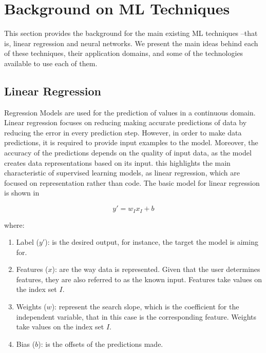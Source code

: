 

\section{Background on \acl{ML} Techniques}
\label{sec:related}

This section provides the background for the main existing \ac{ML} techniques --that is, linear 
regression and neural networks. We present the main ideas behind each of these techniques, their 
application domains, and some of the technologies available to use each of them. 

\subsection{Linear Regression}
\label{sec:linear-regression}

Regression Models are used for the prediction of values in a continuous domain. Linear regression 
focuses on reducing making accurate predictions of data by reducing the error in every prediction 
step. However, in order to make data predictions, it is required to provide input examples to the 
model. Moreover, the accuracy of the predictions depends on the quality of input data, as the model 
creates data representations based on its input. this highlights the main characteristic of supervised 
learning models, as linear regression, which are focused on representation rather than code. The 
basic model for linear regression is shown in 

\begin{equation} \label{eq:linearReg}
y'=w_I x_I+b
\end{equation}

where:
\begin{enumerate}
 \item Label ($y'$): is the desired output, for instance, the target the model is aiming for.
 \item Features ($x$):  are the way data is represented. Given that the user determines features, they are also referred to as the known input. Features take values on the index set $I$. 
 \item Weights ($w$): represent the search slope, which is the coefficient for the independent variable, that in this case is the corresponding feature.  Weights take values on the index set $I$. 
 \item Bias ($b$): is the offsets of the predictions made. 
\end{enumerate}

